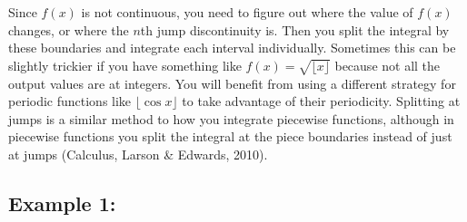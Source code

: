 \documentclass[12pt]{article}
\begin{document}
	\indent\indent Since $f(x)$ is not continuous, you need to figure out where the value of $f(x)$ changes,
	or where the $n$th jump discontinuity is. Then you split the integral by these boundaries and integrate
	each interval individually. Sometimes this can be slightly trickier if you have something like
	$f(x)=\sqrt{\lfloor x\rfloor}$ because not all the output values are at integers. You will benefit from
	using a different strategy for periodic functions like $\lfloor\cos x\rfloor$ to take advantage of
	their periodicity. Splitting at jumps is a similar method to how you integrate piecewise functions,
	although in piecewise functions you split the integral at the piece boundaries instead of just at jumps
	(Calculus, Larson \& Edwards, 2010).

	\subsection*{Example 1:}
\end{document}

